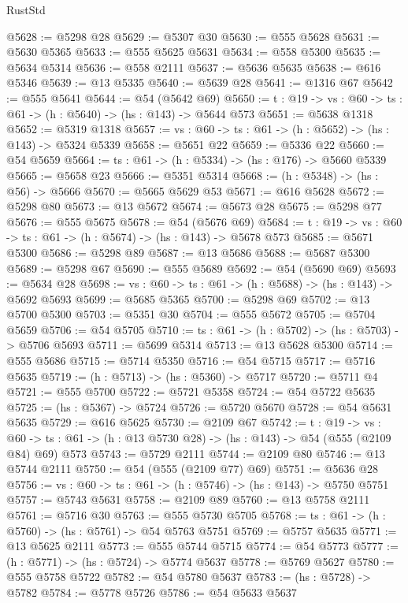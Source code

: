 \begin{lexlean}{RustStd}
\begin{coremodule}
@5628 := @5298 @28
@5629 := @5307 @30
@5630 := @555 @5628
@5631 := @5630 @5365
@5633 := @555 @5625 @5631
@5634 := @558 @5300
@5635 := @5634 @5314
@5636 := @558 @2111
@5637 := @5636 @5635
@5638 := @616 @5346
@5639 := @13 @5335
@5640 := @5639 @28
@5641 := @1316 @67
@5642 := @555 @5641
@5644 := @54 (@5642 @69)
@5650 := {t : @19} -> {vs : @60} -> {ts : @61} -> (h : @5640) -> (hs : @143) -> @5644 @573
@5651 := @5638 @1318
@5652 := @5319 @1318
@5657 := {vs : @60} -> {ts : @61} -> (h : @5652) -> (hs : @143) -> @5324 @5339
@5658 := @5651 @22
@5659 := @5336 @22
@5660 := @54 @5659
@5664 := {ts : @61} -> (h : @5334) -> (hs : @176) -> @5660 @5339
@5665 := @5658 @23
@5666 := @5351 @5314
@5668 := (h : @5348) -> (hs : @56) -> @5666
@5670 := @5665 @5629 @53
@5671 := @616 @5628
@5672 := @5298 @80
@5673 := @13 @5672
@5674 := @5673 @28
@5675 := @5298 @77
@5676 := @555 @5675
@5678 := @54 (@5676 @69)
@5684 := {t : @19} -> {vs : @60} -> {ts : @61} -> (h : @5674) -> (hs : @143) -> @5678 @573
@5685 := @5671 @5300
@5686 := @5298 @89
@5687 := @13 @5686
@5688 := @5687 @5300
@5689 := @5298 @67
@5690 := @555 @5689
@5692 := @54 (@5690 @69)
@5693 := @5634 @28
@5698 := {vs : @60} -> {ts : @61} -> (h : @5688) -> (hs : @143) -> @5692 @5693
@5699 := @5685 @5365
@5700 := @5298 @69
@5702 := @13 @5700 @5300
@5703 := @5351 @30
@5704 := @555 @5672
@5705 := @5704 @5659
@5706 := @54 @5705
@5710 := {ts : @61} -> (h : @5702) -> (hs : @5703) -> @5706 @5693
@5711 := @5699 @5314
@5713 := @13 @5628 @5300
@5714 := @555 @5686
@5715 := @5714 @5350
@5716 := @54 @5715
@5717 := @5716 @5635
@5719 := (h : @5713) -> (hs : @5360) -> @5717
@5720 := @5711 @4
@5721 := @555 @5700
@5722 := @5721 @5358
@5724 := @54 @5722 @5635
@5725 := (hs : @5367) -> @5724
@5726 := @5720 @5670
@5728 := @54 @5631 @5635
@5729 := @616 @5625
@5730 := @2109 @67
@5742 := {t : @19} ->
  {vs : @60} -> {ts : @61} -> (h : @13 @5730 @28) -> (hs : @143) -> @54 (@555 (@2109 @84) @69) @573
@5743 := @5729 @2111
@5744 := @2109 @80
@5746 := @13 @5744 @2111
@5750 := @54 (@555 (@2109 @77) @69)
@5751 := @5636 @28
@5756 := {vs : @60} -> {ts : @61} -> (h : @5746) -> (hs : @143) -> @5750 @5751
@5757 := @5743 @5631
@5758 := @2109 @89
@5760 := @13 @5758 @2111
@5761 := @5716 @30
@5763 := @555 @5730 @5705
@5768 := {ts : @61} -> (h : @5760) -> (hs : @5761) -> @54 @5763 @5751
@5769 := @5757 @5635
@5771 := @13 @5625 @2111
@5773 := @555 @5744 @5715
@5774 := @54 @5773
@5777 := (h : @5771) -> (hs : @5724) -> @5774 @5637
@5778 := @5769 @5627
@5780 := @555 @5758 @5722
@5782 := @54 @5780 @5637
@5783 := (hs : @5728) -> @5782
@5784 := @5778 @5726
@5786 := @54 @5633 @5637

\end{coremodule}
\end{lexlean}
